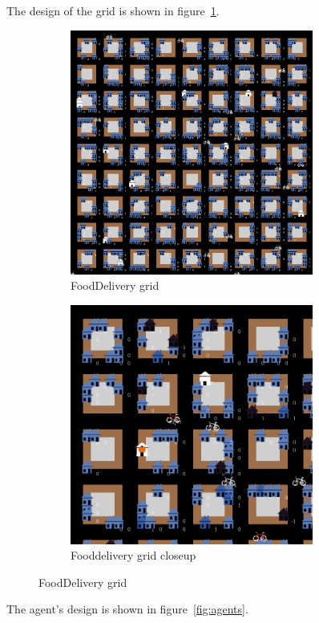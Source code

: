 The design of the grid is shown in figure~\ref{fig:grid}.
\begin{center}
\begin{figure}
    \centering
    \begin{subfigure}[m]{0.8\textwidth}
        \centering
        \includegraphics[width=8cm]{sections/pics/grid}
        \caption{FoodDelivery grid}
    \end{subfigure}
    \hfill
    \begin{subfigure}[m]{0.8\textwidth}
        \centering
        \includegraphics[width=8cm]{sections/pics/grid_closeup}
        \caption{Fooddelivery grid closeup}
    \end{subfigure}
    \caption{FoodDelivery grid}
    \label{fig:grid}
\end{figure}

\end{center}
The agent's design is shown in figure~\ref{fig:agents}.
